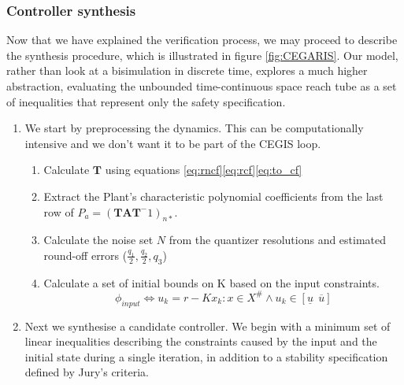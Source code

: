 \documentclass[runningheads,a4paper]{llncs}
\newcommand{\mat}[1]{\boldsymbol{#1}}
\begin{document}
\subsubsection{Controller synthesis}\label{sec:cof_synth}
Now that we have explained the verification process, we may proceed to describe the synthesis procedure, which is illustrated in figure \ref{fig:CEGARIS}.
Our model, rather than look at a bisimulation  in discrete time, explores a much higher abstraction, 
evaluating the unbounded time-continuous space reach tube as a set of inequalities that represent only the safety specification.

\begin{enumerate}
\item 
We start by preprocessing the dynamics. This can be computationally intensive and we don't want it to be part of the CEGIS loop.
\begin{enumerate}
\item Calculate $\mat{T}$ using equations \eqref{eq:rncf}\eqref{eq:rcf}\eqref{eq:to_cf}
\item Extract the Plant's characteristic polynomial coefficients from the last row of $P_a=(\mat{T}\mat{A}\mat{T}^-1)_{n*}$.
\item Calculate the noise set $N$ from the quantizer resolutions and estimated round-off errors ($\frac{q_1}{2},\frac{q_2}{2},q_3$)
\item Calculate a set of initial bounds on K based on the input constraints. $$\phi_{input} \Leftrightarrow u_k=r-Kx_k : x \in X^\# \wedge u_k \in [\underline{u}\ \ \overline{u}]$$
\end{enumerate}
\item Next we synthesise a candidate controller. 
We begin with a minimum set of linear inequalities describing the constraints caused by the input and the initial state during a single iteration, in addition to a stability specification defined by Jury's criteria. %


\end{enumerate}
\end{document}
